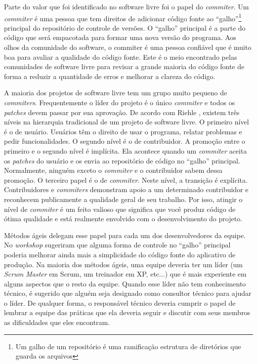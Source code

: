 Parte do valor que foi identificado no software livre foi o papel do
\emph{commiter}. Um \emph{commiter} é uma pessoa que tem direitos de
adicionar código fonte ao ``galho''\footnote{Um galho de um
  repositório é uma ramificação estrutura de diretórios que guarda os
  arquivos} principal do repositório de controle de versões. O
``galho'' principal é a parte do código que será empacotada para
formar uma nova versão do programa. Aos olhos da comunidade do
software, o commiter é uma pessoa confiável que é muito boa para
avaliar a qualidade do código fonte. Este é o meio encontrado pelas
comunidades de software livre para revisar a grande maioria do código
fonte de forma a reduzir a quantidade de erros e melhorar a clareza do
código.

A maioria dos projetos de software livre tem um grupo muito pequeno de
\emph{commiters}. Frequentemente o líder do projeto é o único
\emph{commiter} e todos os \emph{patches} devem passar por sua
aprovação. De acordo com Riehle \cite{Riehle2007}, existem três níveis
na hierarquia tradicional de um projeto de software livre. O primeiro
nível é o de usuário. Usuários têm o direito de usar o programa,
relatar problemas e pedir funcionalidades. O segundo nível é o de
contribuidor. A promoção entre o primeiro e o segundo nível é
implícita. Ela acontece quando um \emph{commiter} aceita os
\emph{patches} do usuário e os envia ao repositório de código no
``galho'' principal. Normalmente, ninguém exceto o \emph{commiter} e o
contribuidor sabem dessa promoção. O terceiro papel é o de
\emph{commiter}. Neste nível, a transição é explícita. Contribuidores
e \emph{commiters} demonstram apoio a um determinado contribuidor e
reconhecem publicamente a qualidade geral de seu trabalho. Por isso,
atingir o nível de \emph{commiter} é um feito valioso que significa
que você produz código de ótima qualidade e está realmente envolvido
com o desenvolvimento do projeto.

Métodos ágeis delegam esse papel para cada um dos desenvolvedores da
equipe. No \emph{workshop} sugeriram que alguma forma de controle no
``galho'' principal poderia melhorar ainda mais a simplicidade do
código fonte do aplicativo de produção. Na maioria dos métodos ágeis,
uma equipe deveria ter um líder (um \emph{Scrum Master} em Scrum, um
treinador em XP, etc...) que é mais experiente em alguns aspectos que
o resto da equipe. Quando esse líder não tem conhecimento técnico, é
sugerido que alguém seja designado como consultor técnico para ajudar
o líder. De qualquer forma, o responsável técnico deveria cumprir o
papel de lembrar a equipe das práticas que ela deveria seguir e
discutir com seus membros as dificuldades que eles encontram.

